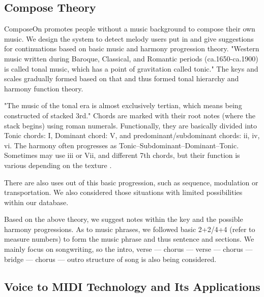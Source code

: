 \subsection{Compose Theory}
ComposeOn promotes people without a music background to compose their own music. We design the system to detect melody users put in and give suggestions for continuations based on basic music and harmony progression theory. "Western music written during Baroque, Classical, and Romantic periods (ca.1650-ca.1900) is called tonal music, which has a point of gravitation called tonic." \citep{laitz2008complete} The keys and scales gradually formed based on that and thus formed tonal hierarchy and harmony function theory.

"The music of the tonal era is almost exclusively tertian, which means being constructed of stacked 3rd." \citep{kostka2006materials} Chords are marked with their root notes (where the stack begins) using roman numerals. Functionally, they are basically divided into Tonic chords: I, Dominant chord: V, and predominant/subdominant chords: ii, iv, vi. The harmony often progresses as Tonic–Subdominant–Dominant–Tonic. Sometimes may use iii or Vii, and different 7th chords, but their function is various depending on the texture \citep{aldwell2010harmony}.

There are also uses out of this basic progression, such as sequence, modulation or transportation. We also considered those situations with limited possibilities within our database.

Based on the above theory, we suggest notes within the key and the possible harmony progressions. As to music phrases, we followed basic 2+2/4+4 (refer to measure numbers) to form the music phrase and thus sentence and sections. \citep{schoenberg1967fundamentals} We mainly focus on songwriting, so the intro, verse — chorus — verse — chorus —bridge — chorus — outro structure of song is also being considered. \citep{masterclass2021songwriting}

\subsection{Voice to MIDI Technology and Its Applications}

